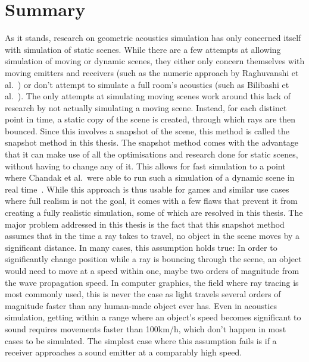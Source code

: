 \chapter{Summary}\label{ch:Summary}

As it stands, research on geometric acoustics simulation has only concerned itself with simulation of static scenes.
While there are a few attempts at allowing simulation of moving or dynamic scenes,
they either only concern themselves with moving emitters and receivers
(such as the numeric approach by Raghuvanshi et al.~\cite{RS10})
or don't attempt to simulate a full room's acoustics (such as Bilibashi et al.~\cite{BVD20}).
\newline
The only attempts at simulating moving scenes work around this lack of research by not actually simulating a moving scene.
Instead, for each distinct point in time, a static copy of the scene is created,
through which rays are then bounced.
Since this involves a snapshot of the scene, this method is called the snapshot method in this thesis.
\newline
The snapshot method comes with the advantage that it can make use of all the optimisations and research done for static scenes,
without having to change any of it.
This allows for fast simulation to a point where Chandak et al.~were able to run such a simulation of a dynamic scene in real time~\cite{Cha08}.
While this approach is thus usable for games and similar use cases where full realism is not the goal,
it comes with a few flaws that prevent it from creating a fully realistic simulation,
some of which are resolved in this thesis.
\newline
The major problem addressed in this thesis is the fact that this snapshot method assumes that in the time a ray takes to travel,
no object in the scene moves by a significant distance.
In many cases, this assumption holds true:
In order to significantly change position while a ray is bouncing through the scene,
an object would need to move at a speed within one, maybe two orders of magnitude from the wave propagation speed.
In computer graphics, the field where ray tracing is most commonly used,
this is never the case as light travels several orders of magnitude faster than any human-made object ever has.
Even in acoustics simulation, getting within a range where an object's speed becomes significant to sound
requires movements faster than 100km/h, which don't happen in most cases to be simulated.
\newline
The simplest case where this assumption fails is if a receiver approaches a sound emitter at a comparably high speed.
